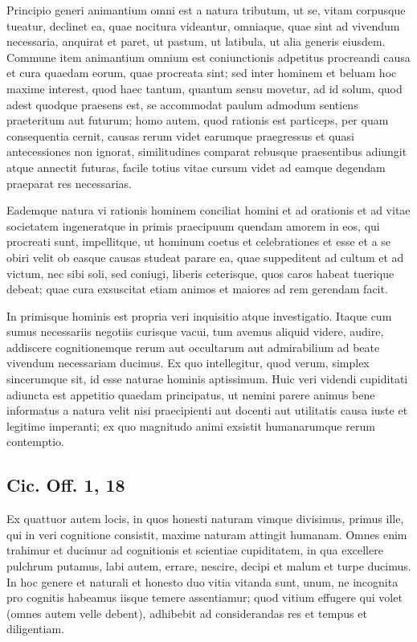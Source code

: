 
Principio generi animantium omni est a natura tributum, ut se, vitam corpusque tueatur, declinet ea, quae nocitura videantur, omniaque, quae sint ad vivendum necessaria, anquirat et paret, ut pastum, ut latibula, ut alia generis eiusdem. Commune item animantium omnium est coniunctionis adpetitus procreandi causa et cura quaedam eorum, quae procreata sint; sed inter hominem et beluam hoc maxime interest, quod haec tantum, quantum sensu movetur, ad id solum, quod adest quodque praesens est, se accommodat paulum admodum sentiens praeteritum aut futurum; homo autem, quod rationis est particeps, per quam consequentia cernit, causas rerum videt earumque praegressus et quasi antecessiones non ignorat, similitudines comparat rebusque praesentibus adiungit atque annectit futuras, facile totius vitae cursum videt ad eamque degendam praeparat res necessarias.

Eademque natura vi rationis hominem conciliat homini et ad orationis et ad vitae societatem ingeneratque in primis praecipuum quendam amorem in eos, qui procreati sunt, impellitque, ut hominum coetus et celebrationes et esse et a se obiri velit ob easque causas studeat parare ea, quae suppeditent ad cultum et ad victum, nec sibi soli, sed coniugi, liberis ceterisque, quos caros habeat tuerique debeat; quae cura exsuscitat etiam animos et maiores ad rem gerendam facit.

In primisque hominis est propria veri inquisitio atque investigatio. Itaque cum sumus necessariis negotiis curisque vacui, tum avemus aliquid videre, audire, addiscere cognitionemque rerum aut occultarum aut admirabilium ad beate vivendum necessariam ducimus. Ex quo intellegitur, quod verum, simplex sincerumque sit, id esse naturae hominis aptissimum. Huic veri videndi cupiditati adiuncta est appetitio quaedam principatus, ut nemini parere animus bene informatus a natura velit nisi praecipienti aut docenti aut utilitatis causa iuste et legitime imperanti; ex quo magnitudo animi exsistit humanarumque rerum contemptio.

\subsection*{Cic. Off. 1, 18}


Ex quattuor autem locis, in quos honesti naturam vimque divisimus, primus ille, qui in veri cognitione consistit, maxime naturam attingit humanam. Omnes enim trahimur et ducimur ad cognitionis et scientiae cupiditatem, in qua excellere pulchrum putamus, labi autem, errare, nescire, decipi et malum et turpe ducimus. In hoc genere et naturali et honesto duo vitia vitanda sunt, unum, ne incognita pro cognitis habeamus iisque temere assentiamur; quod vitium effugere qui volet (omnes autem velle debent), adhibebit ad considerandas res et tempus et diligentiam.
